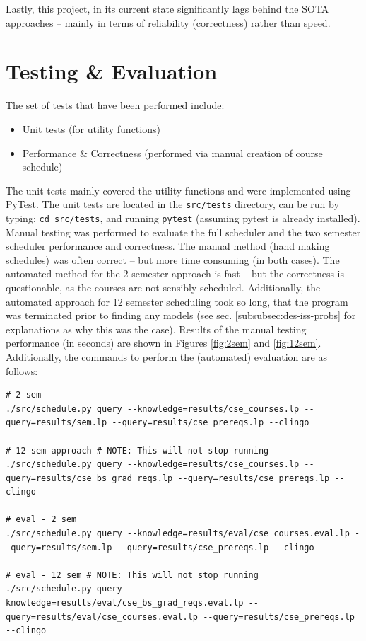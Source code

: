 \documentclass[12pt]{article}
\begin{document}
    Lastly, this project, in its current state significantly lags behind the SOTA approaches -- mainly in terms of reliability (correctness) rather than speed.
    
    \section{Testing \& Evaluation}
    \label{sec:test-eval}

    The set of tests that have been performed include: 

    \begin{itemize}
        \item Unit tests (for utility functions)
        \item Performance \& Correctness (performed via manual creation of course schedule)
    \end{itemize}

    The unit tests mainly covered the utility functions and were implemented using PyTest. The unit tests are located in the {\tt{src/tests}} directory, can be run by typing: {\tt{cd src/tests}}, and running {\tt{pytest}} (assuming pytest is already installed). Manual testing was performed to evaluate the full scheduler and the two semester scheduler performance and correctness. The manual method (hand making schedules) was often correct -- but more time consuming (in both cases). The automated method for the 2 semester approach is fast -- but the correctness is questionable, as the courses are not sensibly scheduled. Additionally, the automated approach for 12 semester scheduling took so long, that the program was terminated prior to finding any models (see sec. \ref{subsubsec:des-iss-probs} for explanations as why this was the case). Results of the manual testing performance (in seconds) are shown in Figures \ref{fig:2sem} and \ref{fig:12sem}. Additionally, the commands to perform the (automated) evaluation are as follows: \\

    \begin{lstlisting}
# 2 sem
./src/schedule.py query --knowledge=results/cse_courses.lp --query=results/sem.lp --query=results/cse_prereqs.lp --clingo

# 12 sem approach # NOTE: This will not stop running
./src/schedule.py query --knowledge=results/cse_courses.lp --query=results/cse_bs_grad_reqs.lp --query=results/cse_prereqs.lp --clingo

# eval - 2 sem
./src/schedule.py query --knowledge=results/eval/cse_courses.eval.lp --query=results/sem.lp --query=results/cse_prereqs.lp --clingo

# eval - 12 sem # NOTE: This will not stop running
./src/schedule.py query --knowledge=results/eval/cse_bs_grad_reqs.eval.lp --query=results/eval/cse_courses.eval.lp --query=results/cse_prereqs.lp --clingo
    \end{lstlisting}
\end{document}
